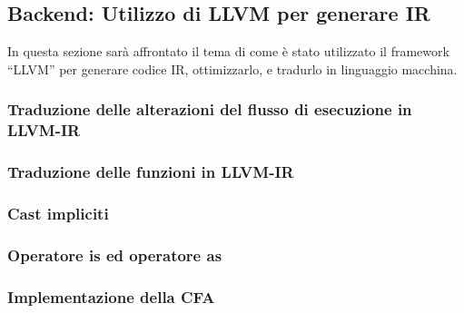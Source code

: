 \subsection{Backend: Utilizzo di LLVM per generare IR}
In questa sezione sarà affrontato il tema di come è stato utilizzato il framework “LLVM” per 
generare codice IR, ottimizzarlo, e tradurlo in linguaggio macchina.




\subsubsection{Traduzione delle alterazioni del flusso di esecuzione in LLVM-IR}
\subsubsection{Traduzione delle funzioni in LLVM-IR}
\subsubsection{Cast impliciti}
\subsubsection{Operatore is ed operatore as}
\subsubsection{Implementazione della CFA}